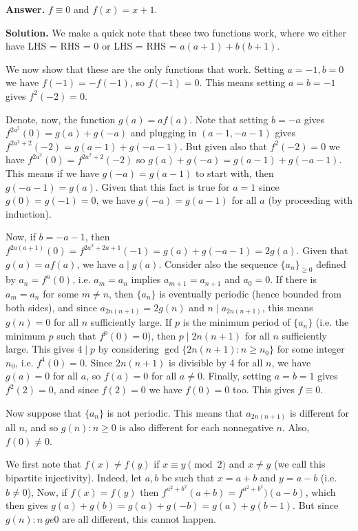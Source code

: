 \documentclass[11pt,a4paper]{article}
\begin{document}
\begin{enumerate}
	\textbf{Answer.} $f\equiv 0$ and $f(x) = x + 1$. 
	
	\textbf{Solution.} 
	We make a quick note that these two functions work, where we either have LHS = RHS = 0 or LHS = RHS = $a(a+1)+b(b+1)$. 
	
	We now show that these are the only functions that work. 
	Setting $a = -1, b = 0$ we have $f(-1)=-f(-1)$, so $f(-1)=0$. 
	This means setting $a=b=-1$ gives $f^2(-2)=0$. 
	
	Denote, now, the function $g(a) = af(a)$. 
	Note that setting $b=-a$ gives $f^{2a^2}(0) = g(a) + g(-a)$ and 
	plugging in $(a - 1, -a - 1)$ gives $f^{2a^2+2}(-2)=g(a-1)+g(-a-1)$. 
	But given also that $f^{2}(-2)=0$ we have $f^{2a^2}(0) = f^{2a^2+2}(-2)$ so 
	$g(a) + g(-a) = g(a-1)+g(-a-1)$. 
	This means if we have $g(-a)=g(a-1)$ to start with, then $g(-a-1)=g(a)$. 
	Given that this fact is true for $a=1$ since $g(0)=g(-1)=0$, 
	we have $g(-a)=g(a-1)$ for all $a$ (by proceeding with induction). 
	
	Now, if $b=-a-1$, then $f^{2a(a + 1)}(0) = f^{2a^2+2a+1}(-1)=g(a)+g(-a-1)=2g(a)$. 
	Given that $g(a)=af(a)$, we have $a\mid g(a)$. 
	Consider also the sequence $\{a_n\}_{\ge 0}$ defined by $a_n=f^n(0)$, 
	i.e. $a_m = a_n$ implies $a_{m+1}=a_{n+1}$ and $a_0=0$. 
	If there is $a_m=a_n$ for some $m\neq n$, then $\{a_n\}$ is eventually periodic (hence bounded from both sides), 
	and since $a_{2n(n+1)} = 2g(n)$ and $n\mid a_{2n(n+1)}$, 
	this means $g(n)=0$ for all $n$ sufficiently large. 
	If $p$ is the minimum period of $\{a_n\}$ (i.e. the minimum $p$ such that $f^p(0)=0$), 
	then $p\mid 2n(n + 1)$ for all $n$ sufficiently large. 
	This gives $4\mid p$ by considering $\gcd\{2n(n+1): n\ge n_0\}$ for some integer $n_0$, 
	i.e. $f^4(0)=0$. 
	Since $2n(n+1)$ is divisible by 4 for all $n$, we have $g(a)=0$ for all $a$, 
	so $f(a)=0$ for all $a\neq 0$. 
	Finally, setting $a=b=1$ gives $f^2(2)=0$, and since $f(2)=0$ we have $f(0)=0$ too. 
	This gives $f\equiv 0$. 
	
	Now suppose that $\{a_n\}$ is not periodic. 
	This means that $a_{2n(n+1)}$ is different for all $n$, and so $g(n): n\ge 0$ is also different for each nonnegative $n$. 
	Also, $f(0)\neq 0$. 
	
	We first note that $f(x)\neq f(y)$ if $x\equiv y\pmod{2}$ and $x\neq y$ 
	(we call this bipartite injectivity). 
	Indeed, let $a, b$ be such that $x = a + b$ and $y = a - b$ (i.e. $b\neq 0$), 
	Now, if $f(x)=f(y)$ then $f^{a^2+b^2}(a + b) = f^{a^2 + b^2})(a - b)$, 
	which then gives $g(a) + g(b) = g(a) + g(-b) = g(a) + g(b - 1)$. 
	But since $g(n): n\ ge 0$ are all different, this cannot happen. 
	

\end{enumerate}
\end{document}
